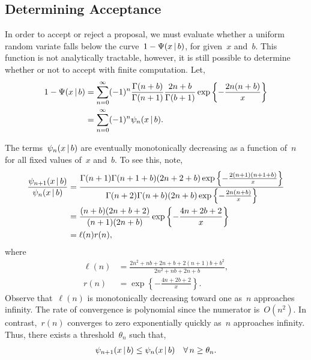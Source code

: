 \documentclass[aos,preprint]{imsart}
\begin{document}
\subsection{Determining Acceptance}
In order to accept or reject a proposal, we must evaluate whether a uniform random variate 
falls below the curve~$1-\Psi(x \,|\, b)$, for given~$x$ and~$b$. This function is 
not analytically tractable, however, it is still possible to determine whether or not to accept 
with finite computation.
Let,
\begin{align}
1-\Psi(x \given b) 
  &=
    \sum_{n=0}^\infty (-1)^n \frac{\Gamma(n+b)}{\Gamma(n+1)} \frac{2n+b}{\Gamma(b+1)}
    \exp\left\{- \frac{2n(n+b)}{x} \right\} \\
  &= \sum_{n=0}^\infty (-1)^n \psi_n(x \given b).
\end{align}

The terms~$\psi_n(x \,|\, b)$ are eventually monotonically decreasing as a function of~$n$ 
for all fixed values of~$x$ and~$b$. To see this, note,
\begin{align}
\frac{\psi_{n+1}(x \given b)}{\psi_n(x \given b)} &= 
\frac{ \Gamma(n+1) \Gamma(n+1+b) (2n + 2 + b) \exp \left \{ - \frac{2(n+1)(n+1+b)}{x} \right \}}
{ \Gamma(n+2) \Gamma(n+b) (2n + b) \exp \left \{ - \frac{2n(n+b)}{x} \right \}} \\
&= 
\frac{(n+b)(2n+b+2)}{(n+1)(2n+b)} 
\exp \left \{ -\frac{4n +2b +2}{x}  \right \} \\
&= \ell(n) r(n),
\end{align}
where
\begin{align}
\ell(n) &= \frac{2n^2+nb+2n+b + 2(n+1)b + b^2}{2n^2+nb+2n+b}, \\
r(n) &= \exp \left \{ -\frac{4n +2b +2}{x}  \right \}.
\end{align}
Observe that~$\ell(n)$ is monotonically decreasing toward one as~$n$ approaches infinity. 
The rate of convergence is polynomial since the numerator is~${O(n^2)}$.
In contrast,~$r(n)$ converges to zero exponentially quickly as~$n$ approaches infinity. 
Thus, there exists a threshold~$\theta_n$ such that,
\begin{align}
\psi_{n+1}(x \given b) \leq \psi_{n}(x \given b) \quad \forall \, n \geq \theta_n.
\end{align}
\end{document}
